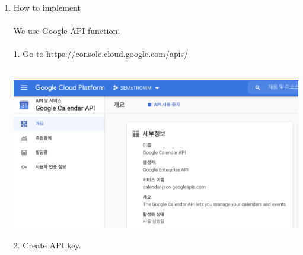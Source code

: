 \documentclass[conference]{IEEEtran}
\begin{document}
\begin{enumerate}
    \item How to implement \\ \\
        We use Google API function. \\ \\
        1. Go to https://console.cloud.google.com/apis/ \\ \\
        \centerline{\includegraphics[scale=0.3]{assets/reminder.png}}
        2. Create API key.\\ \\
\end{enumerate}


\break
\end{document}
